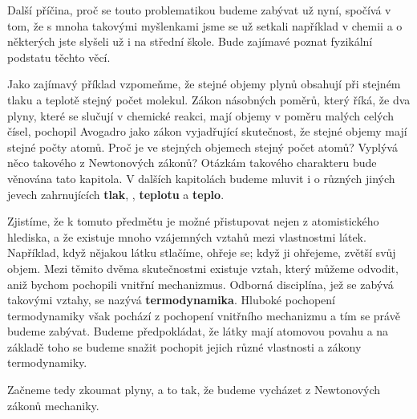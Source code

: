     Další příčina, proč se touto problematikou budeme zabývat už nyní, spočívá v tom, že s mnoha
    takovými myšlenkami jsme se už setkali například v chemii a o některých jste slyšeli už i na
    střední škole. Bude zajímavé poznat fyzikální podstatu těchto věcí.
    
    Jako zajímavý příklad vzpomeňme, že stejné objemy plynů obsahují při stejném tlaku a teplotě
    stejný počet molekul. Zákon násobných poměrů, který říká, že dva plyny, které se slučují v
    chemické reakci, mají objemy v poměru malých celých čísel, pochopil Avogadro jako zákon
    vyjadřující skutečnost, že stejné objemy mají stejné počty atomů. Proč je ve stejných objemech
    stejný počet atomů? Vyplývá něco takového z Newtonových zákonů? Otázkám takového charakteru bude
    věnována tato kapitola. V dalších kapitolách budeme mluvit i o různých jiných jevech
    zahrnujících \textbf{tlak}, , \textbf{teplotu} a \textbf{teplo}. 
    
    Zjistíme, že k tomuto předmětu je možné přistupovat nejen z atomistického hlediska, a že
    existuje mnoho vzájemných vztahů mezi vlastnostmi látek. Například, když nějakou látku stlačíme,
    ohřeje se; když ji ohřejeme, zvětší svůj objem. Mezi těmito dvěma skutečnostmi existuje vztah,
    který můžeme odvodit, aniž bychom pochopili vnitřní mechanizmus. Odborná disciplína, jež se
    zabývá takovými vztahy, se nazývá \textbf{termodynamika}. Hluboké pochopení termodynamiky však
    pochází z pochopení vnitřního mechanizmu a tím se právě budeme zabývat. Budeme předpokládat, že
    látky mají atomovou povahu a na základě toho se budeme snažit pochopit jejich různé vlastnosti a
    zákony termodynamiky.
    
    Začneme tedy zkoumat plyny, a to tak, že budeme vycházet z Newtonových zákonů mechaniky.
    
